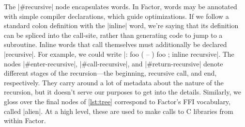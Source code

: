 The \factor|#recursive| node encapsulates  words.  In
Factor, words may be annotated with simple compiler declarations, which guide
optimizations.  If we follow a standard colon definition with the
\factor|inline| word, we're saying that its definition can be spliced into the
call-site, rather than generating code to jump to a subroutine.  Inline words
that call themselves must additionally be declared \factor|recursive|.  For
example, we could write
%
\factor|: foo ( -- ) foo ; inline recursive|.
%
The nodes \factor|#enter-recursive|, \factor|#call-recursive|, and
\factor|#return-recursive| denote different stages of the recursion---the
beginning, recursive call, and end, respectively.  They carry around a lot of
metadata about the nature of the recursion, but it doesn't serve our purposes
to get into the details.  Similarly, we gloss over the final nodes of
\vref{lst:tree} correspond to Factor's \gls{FFI} vocabulary, called
\factor|alien|.  At a high level, these are used to make calls to C libraries
from within Factor.



